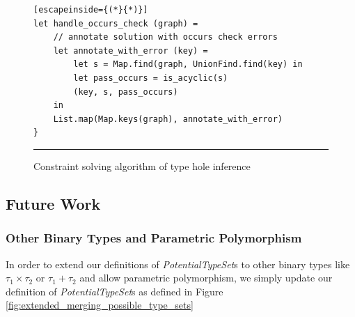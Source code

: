 \begin{figure}[h!]
\begin{lstlisting}[escapeinside={(*}{*)}]
let handle_occurs_check (graph) =
    // annotate solution with occurs check errors
    let annotate_with_error (key) =
        let s = Map.find(graph, UnionFind.find(key) in
        let pass_occurs = is_acyclic(s)
        (key, s, pass_occurs)
    in
    List.map(Map.keys(graph), annotate_with_error)
}
\end{lstlisting}
\vspace{-4px}
 \hrule
\caption{Constraint solving algorithm of type hole inference}
\label{fig:occurs_check}
\end{figure}

\subsection{Future Work}
\subsubsection{Other Binary Types and Parametric Polymorphism}
In order to extend our definitions of \emph{PotentialTypeSet}s to other binary types like $\tau_1 \times \tau_2$ or $\tau_1 + \tau_2$ and allow parametric polymorphism, we simply update our definition of \emph{PotentialTypeSet}s as defined in Figure \ref{fig:extended_merging_possible_type_sets}

